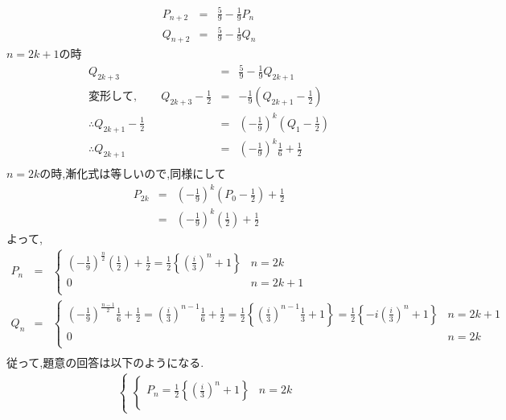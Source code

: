 \documentclass[dvipdfmx,titlepage, 11pt, a4paper]{jsarticle}%
\begin{document}
\begin{enumerate}[(1)]
\begin{eqnarray*}
			P_{n + 2} &=& \frac{5}{9} - \frac{1}{9}P_{n}\\
			Q_{n + 2} &=& \frac{5}{9} - \frac{1}{9}Q_{n}
		  \end{eqnarray*}
		  $n = 2k + 1$の時
		  \begin{eqnarray*}
			Q_{2k + 3} &=& \frac{5}{9} - \frac{1}{9}Q_{2k + 1}\\
			変形して,\qquad
			Q_{2k + 3} - \frac{1}{2}&=& -\frac{1}{9}\left(Q_{2k + 1} - \frac{1}{2}\right)\\
			\therefore Q_{2k + 1} - \frac{1}{2} &=& \left(-\frac{1}{9}\right)^{k}\left(Q_{1} - \frac{1}{2}\right)\\
			\therefore Q_{2k + 1} &=& \left(-\frac{1}{9}\right)^{k}\frac{1}{6} + \frac{1}{2}\\
		  \end{eqnarray*}
		  $n = 2k$の時,漸化式は等しいので,同様にして
		  \begin{eqnarray*}
			P_{2k} &=& \left(-\frac{1}{9}\right)^{k}\left(P_{0} - \frac{1}{2}\right) + \frac{1}{2}\\
			&=& \left(-\frac{1}{9}\right)^{k}\left(\frac{1}{2}\right) + \frac{1}{2}
		  \end{eqnarray*}
		  よって,
		  \begin{eqnarray*}
			  P_{n} 
			  &=& \begin{cases}
				\left(-\frac{1}{9}\right)^{\frac{n}{2}}\left(\frac{1}{2}\right) + \frac{1}{2}  
				= \frac{1}{2}\left\{\left(\frac{i}{3}\right)^{n} + 1\right\} & n = 2k\\
				0 & n = 2k + 1\\
			  \end{cases}\\
			  Q_{n} 
			  &=& \begin{cases}
				\left(-\frac{1}{9}\right)^{\frac{n - 1}{2}}\frac{1}{6} + \frac{1}{2}
				= \left(\frac{i}{3}\right)^{n - 1}\frac{1}{6} + \frac{1}{2} = \frac{1}{2}\left\{\left(\frac{i}{3}\right)^{n - 1}\frac{1}{3} + 1\right\}
				= \frac{1}{2}\left\{-i\left(\frac{i}{3}\right)^{n} + 1\right\} & n = 2k + 1\\
				0 & n = 2k\\
			  \end{cases}\\
		  \end{eqnarray*}
		  従って,題意の回答は以下のようになる.
		  \begin{eqnarray}
			  \begin{cases} 
				\begin{cases}
				  P_n = \frac{1}{2}\left\{\left(\frac{i}{3}\right)^{n} + 1\right\} & n = 2k\\

\end{cases}
\end{cases}
\end{eqnarray}
\end{enumerate}
\end{document}
